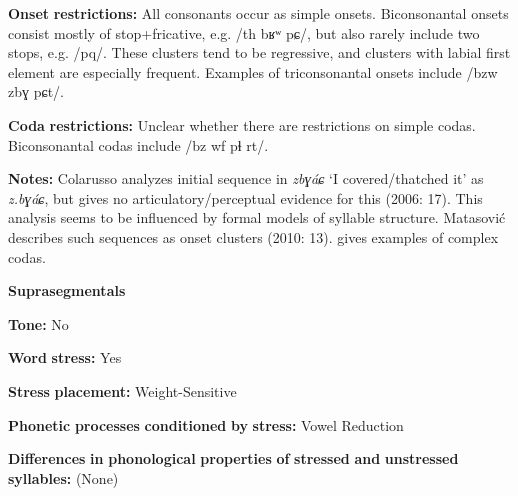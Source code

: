 \documentclass[output=paper]{langsci/langscibook}
\begin{document}
\begin{styleBody}
\textbf{Onset} \textbf{restrictions:} All consonants occur as simple onsets. Biconsonantal onsets consist mostly of stop+fricative, e.g. /th bʁʷ pɕ/, but also rarely include two stops, e.g. /pq/. These clusters tend to be regressive, and clusters with labial first element are especially frequent. Examples of triconsonantal onsets include /bzw zbɣ pɕt/.
\end{styleBody}

\begin{styleBody}
\textbf{Coda} \textbf{restrictions:} Unclear whether there are restrictions on simple codas. Biconsonantal codas include /bz wf pɬ rt/.
\end{styleBody}

\begin{styleBody}
\textbf{Notes:} Colarusso analyzes initial sequence in \textit{zbɣáɕ} ‘I covered/thatched it’ as \textit{z.bɣáɕ}, but gives no articulatory/perceptual evidence for this (2006: 17). This analysis seems to be influenced by formal models of syllable structure. Matasović describes such sequences as onset clusters (2010: 13). \citet{Applebaum2013} gives examples of complex codas.
\end{styleBody}

\begin{styleBody}
\textbf{Suprasegmentals}
\end{styleBody}

\begin{styleBody}
\textbf{Tone:} No
\end{styleBody}

\begin{styleBody}
\textbf{Word} \textbf{stress:} Yes
\end{styleBody}

\begin{styleBody}
\textbf{Stress} \textbf{placement:} Weight-Sensitive
\end{styleBody}

\begin{styleBody}
\textbf{Phonetic} \textbf{processes} \textbf{conditioned} \textbf{by} \textbf{stress:} Vowel Reduction
\end{styleBody}

\begin{styleBody}
\textbf{Differences} \textbf{in} \textbf{phonological} \textbf{properties} \textbf{of} \textbf{stressed} \textbf{and} \textbf{unstressed} \textbf{syllables:} (None)
\end{styleBody}
\end{document}
